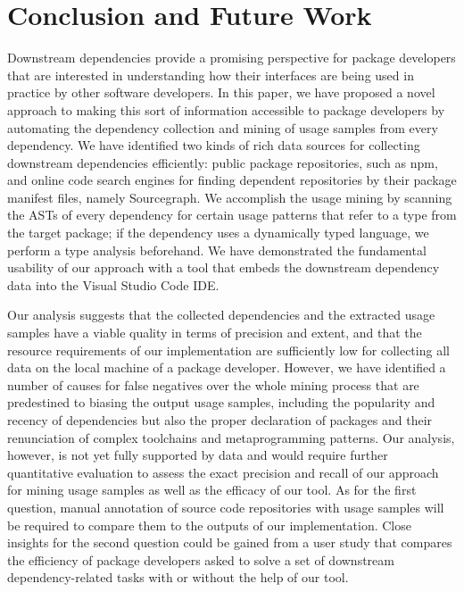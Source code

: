 \section{Conclusion and Future Work}
\label{sec:conclusion}

Downstream dependencies provide a promising perspective for package developers that are interested in understanding how their interfaces are being used in practice by other software developers.
In this paper, we have proposed a novel approach to making this sort of information accessible to package developers by automating the dependency collection and mining of usage samples from every dependency.
We have identified two kinds of rich data sources for collecting downstream dependencies efficiently: public package repositories, such as npm, and online code search engines for finding dependent repositories by their package manifest files, namely Sourcegraph.
We accomplish the usage mining by scanning the ASTs of every dependency for certain usage patterns that refer to a type from the target package; if the dependency uses a dynamically typed language, we perform a type analysis beforehand.
We have demonstrated the fundamental usability of our approach with a tool that embeds the downstream dependency data into the Visual Studio Code IDE.

Our analysis suggests that the collected dependencies and the extracted usage samples have a viable quality in terms of precision and extent, and that the resource requirements of our implementation are sufficiently low for collecting all data on the local machine of a package developer.
However, we have identified a number of causes for false negatives over the whole mining process that are predestined to biasing the output usage samples, including the popularity and recency of dependencies but also the proper declaration of packages and their renunciation of complex toolchains and metaprogramming patterns.
Our analysis, however, is not yet fully supported by data and would require further quantitative evaluation to assess the exact precision and recall of our approach for mining usage samples as well as the efficacy of our tool.
As for the first question, manual annotation of source code repositories with usage samples will be required to compare them to the outputs of our implementation.
Close insights for the second question could be gained from a user study that compares the efficiency of package developers asked to solve a set of downstream dependency-related tasks with or without the help of our tool.

